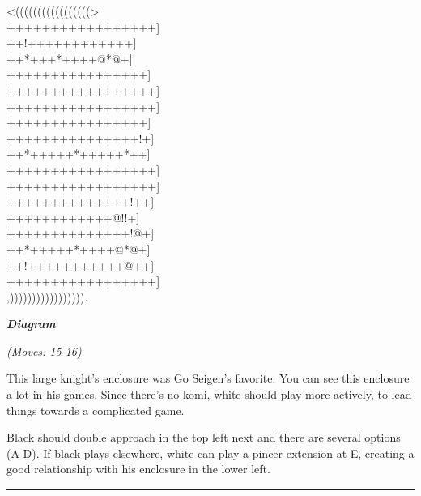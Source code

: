 \documentclass[letterpaper,12pt]{memoir}
\newcounter{GoFigure}[part]
\newcommand{\gofigure}{%
 \stepcounter{GoFigure}
 \centerline{\textit{\textbf{Diagram \arabic{GoFigure}}}}
}
\newcommand{\subtext}[1]{\centerline{\textit{#1}}}
\begin{document}
\begin{minipage}[t]{240pt}

{\gnos
<(((((((((((((((((>\\
+++++++++++++++++]\\
++!++++++++++++]\\
++*+++*++++@*@+]\\
++++++++++++++++]\\
+++++++++++++++++]\\
+++++++++++++++++]\\
++++++++++++++++]\\
+++++++++++++++!+]\\
++*+++++*+++++*++]\\
+++++++++++++++++]\\
+++++++++++++++++]\\
++++++++++++++!++]\\
++++++++++++@!!+]\\
++++++++++++++!@+]\\
++*+++++*++++@*@+]\\
++!+++++++++++@++]\\
+++++++++++++++++]\\
,))))))))))))))))).\\
}
\gofigure
\subtext{(Moves: 15-16)}
\end{minipage}
\begin{minipage}[t]{115.19999999999999pt}
\setlength{\parskip}{0.5em}
This large knight's enclosure was Go Seigen's favorite. You can see this enclosure a lot in his games. Since there's no komi, white should play more actively, to lead things towards a complicated game.

Black should double approach in the top left next and there are several options (A-D). If black plays elsewhere, white can play a pincer extension at E, creating a good relationship with his enclosure in the lower left.


\end{minipage}
\vfill

\rule{\textwidth}{0.5pt}
\end{document}
